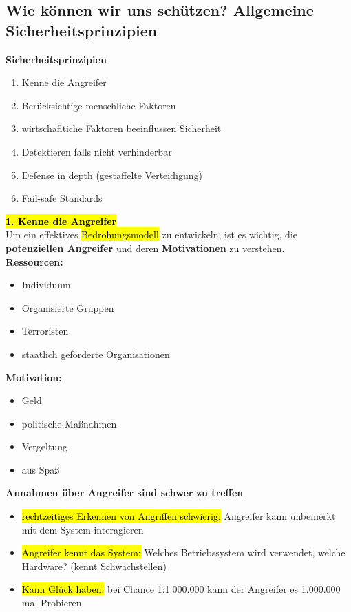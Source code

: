 \documentclass[a4paper, 10pt]{article}
\begin{document}
\subsection{Wie können wir uns schützen? Allgemeine Sicherheitsprinzipien}
\textbf{Sicherheitsprinzipien}
\begin{enumerate}
    \item Kenne die Angreifer
    \item Berücksichtige menschliche Faktoren
    \item wirtschafltiche Faktoren beeinflussen Sicherheit 
    \item Detektieren falls nicht verhinderbar
    \item Defense in depth (gestaffelte Verteidigung)
    \item Fail-safe Standards
\end{enumerate}
\hl{\textbf{1. Kenne die Angreifer}}\\[2mm]
Um ein effektives \hl{Bedrohungsmodell} zu entwickeln, ist es wichtig, die \textbf{potenziellen Angreifer} und deren \textbf{Motivationen} zu verstehen.\\[3mm]
\textbf{Ressourcen:}
\begin{itemize}
    \item Individuum
    \item Organisierte Gruppen
    \item Terroristen
    \item staatlich geförderte Organisationen
\end{itemize}
\textbf{Motivation:}
\begin{itemize}
    \item Geld
    \item politische Maßnahmen
    \item Vergeltung
    \item aus Spaß
\end{itemize}
\textbf{Annahmen über Angreifer sind schwer zu treffen}
\begin{itemize}
    \item \hl{rechtzeitiges Erkennen von Angriffen schwierig:} Angreifer kann unbemerkt mit dem System interagieren
    \item \hl{Angreifer kennt das System:} Welches Betriebssystem wird verwendet, welche Hardware? (kennt Schwachstellen)
    \item  \hl{Kann Glück haben:} bei Chance 1:1.000.000 kann der Angreifer es 1.000.000 mal Probieren
\end{itemize}
\end{document}
